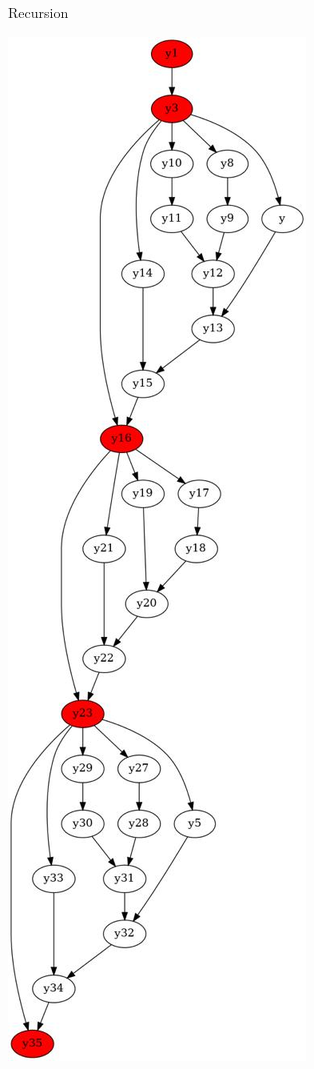 \documentclass[../diploma.tex]{subfiles}
\begin{document}
\begin{figure}[h]
\begin{subfigure}{0.24\textwidth}
    \caption{Recursion}
    \end{subfigure}
    \begin{subfigure}{0.24\textwidth}
    \includegraphics[width=0.9\linewidth]{graph_simple2.jpeg}

\end{subfigure}
\end{figure}
\end{document}
